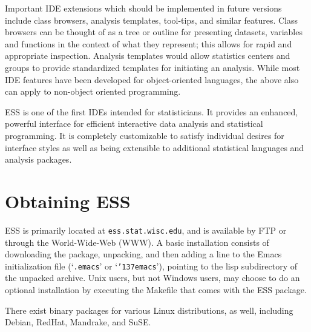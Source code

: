 \documentclass{article}
\newcommand{\stexttt}[1]{{\small\texttt{#1}}}
\newcommand{\US}{{\char'137}}        %
\newcommand{\file}[1]{`\stexttt{#1}'}
\begin{document}
Important IDE extensions which should be implemented in future
versions include class browsers, analysis templates, tool-tips, and
similar features.  Class browsers can be thought of as a tree or
outline for presenting datasets, variables and functions in the
context of what they represent; this allows for rapid and appropriate
inspection.  Analysis templates would allow statistics centers and
groups to provide standardized templates for initiating an analysis.
While most IDE features have been developed for object-oriented
languages, the above also can apply to non-object oriented
programming.

ESS is one of the first IDEs intended for statisticians.  It provides
an enhanced, powerful interface for efficient interactive data
analysis and statistical programming.  It is completely customizable
to satisfy individual desires for interface styles as well as being
extensible to additional statistical languages and analysis packages.

\baselineskip=1.5pc




\appendix
\section{Obtaining ESS}
\label{sec:getIt}

ESS \citep{ESS} is primarily located at \stexttt{ess.stat.wisc.edu},
and is available by FTP or through the World-Wide-Web (WWW).  A basic
installation consists of downloading the package, unpacking, and then
adding a line to the Emacs initialization file (\file{.emacs} or
\file{\US emacs}), pointing to the lisp subdirectory of the unpacked
archive.  Unix users, but not Windows users, may choose to do an
optional installation by executing the Makefile that comes with the
ESS package.

There exist binary packages for various Linux distributions, as well,
including Debian, RedHat, Mandrake, and SuSE.

\clearpage
\end{document}

